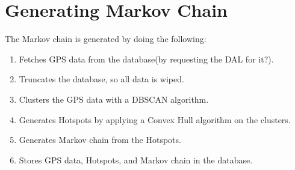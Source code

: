 \section{Generating Markov Chain}\label{sec:generatemarkov}
The Markov chain is generated by doing the following:

\begin{enumerate}
\item Fetches GPS data from the database(by requesting the DAL for it?).
\item Truncates the database, so all data is wiped.
\item Clusters the GPS data with a DBSCAN algorithm.
\item Generates Hotspots by applying a Convex Hull\cite[page 1031]{aadbook} algorithm on the clusters.
\item Generates Markov chain from the Hotspots.
\item Stores GPS data, Hotspots, and Markov chain in the database.
\end{enumerate}
